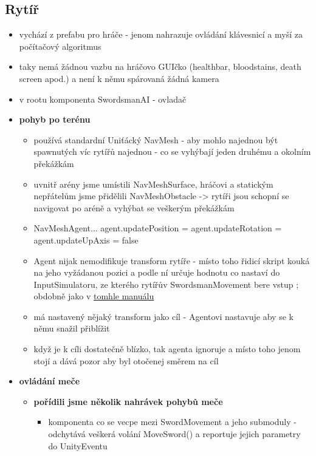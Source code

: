 \subsection{Rytíř} \label{knightEnemySubsection}
\begin{itemize}
  \item vychází z prefabu pro hráče - jenom nahrazuje ovládání klávesnicí a myší za počítačový algoritmus
  \item taky nemá žádnou vazbu na hráčovo GUIčko (healthbar, bloodstains, death screen apod.) a není k němu spárovaná žádná kamera
  \item v rootu komponenta SwordsmanAI - ovladač
  \item \textbf{pohyb po terénu}
    \begin{itemize}
      \item používá standardní Uniťácký NavMesh - aby mohlo najednou být spawnutých víc rytířů najednou - co se vyhýbají jeden druhému a okolním překážkám
      \item uvnitř arény jsme umístili NavMeshSurface, hráčovi a statickým nepřátelům jsme přidělili NavMeshObstacle -> rytíři jsou schopní se navigovat po aréně a vyhýbat se veškerým překážkám
      \item NavMeshAgent... agent.updatePosition = agent.updateRotation = agent.updateUpAxis = false
      \item Agent nijak nemodifikuje transform rytíře - místo toho řidicí skript kouká na jeho vyžádanou pozici a podle ní určuje hodnotu co nastaví do InputSimulatoru, ze kterého rytířův SwordsmanMovement bere vstup ; obdobně jako v \href{https://docs.unity3d.com/Manual/nav-CouplingAnimationAndNavigation.html}{tomhle manuálu} 
      \item má nastavený nějaký transform jako cíl - Agentovi nastavuje aby se k němu snažil přiblížit
      \item když je k cíli dostatečně blízko, tak agenta ignoruje a místo toho jenom stojí a dává pozor aby byl otočenej směrem na cíl
    \end{itemize}
  \item \textbf{ovládání meče}
      \begin{itemize}
        \item \textbf{pořídili jsme několik nahrávek pohybů meče}
          \begin{itemize}
            \item komponenta co se vecpe mezi SwordMovement a jeho submoduly - odchytává veškerá volání MoveSword() a reportuje jejich parametry do UnityEventu

\end{itemize}
\end{itemize}
\end{itemize}
